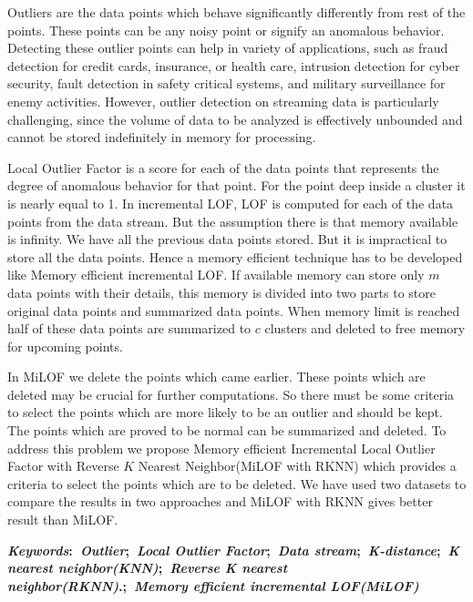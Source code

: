 \thispagestyle{empty} 
\noindent 

Outliers are the data points which behave significantly differently from rest of the points. These points can be any noisy point or signify an anomalous behavior. Detecting these outlier points can help in variety of applications, such as fraud detection for credit cards, insurance, or health care, intrusion detection
for cyber security, fault detection in safety critical systems, and military surveillance
for enemy activities. However, outlier detection on streaming data is particularly
challenging, since the volume of data to be analyzed is
effectively unbounded and cannot be stored indefinitely in
memory for processing. 

Local Outlier Factor is a score for each of the data points that represents the degree of anomalous behavior for that point. For the point deep inside a cluster it is nearly equal to 1. In incremental LOF, LOF is computed for each of the data points from the data stream. But the assumption there is that memory available is infinity. We have all the previous data points stored. But it is impractical to store all the data points. Hence a memory efficient technique has to be developed like Memory efficient incremental LOF. If available memory can store only $m$ data points with their details, this memory is divided into two parts to store original data points and summarized data points.  When memory limit is reached half of these data points are summarized to $c$ clusters and deleted to free memory for upcoming points.

 

\par

\par 
In MiLOF we delete the points which came earlier. These points which are deleted may be crucial for further computations. So there must be some criteria to select the points which are more likely to be an outlier and should be kept. The points which are proved to be normal can be summarized and deleted. To address this problem we propose Memory efficient Incremental Local Outlier Factor with Reverse $K$ Nearest Neighbor(MiLOF with RKNN) which provides a criteria to select the points which are to be deleted. We have used two datasets to compare the results in two approaches and MiLOF with RKNN gives better result than MiLOF.

  


\vspace{5mm}
\noindent\textbf{\textit{Keywords}:~\textit{Outlier};~\textit{Local Outlier Factor};~\textit{Data stream};~\textit{K-distance};~\textit{K nearest neighbor(KNN)};~\textit{Reverse K nearest neighbor(RKNN)}.;~\textit{Memory efficient incremental LOF(MiLOF)}}
